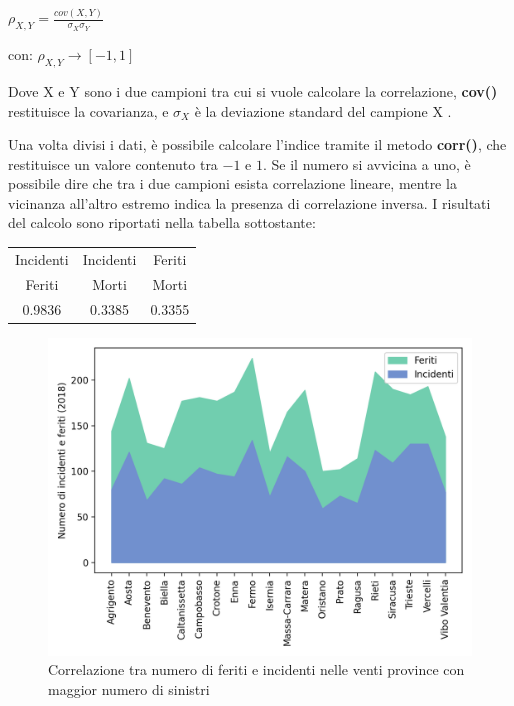 \documentclass[a4paper]{report}
\newcommand{\methodstyle}[1]{\textbf{#1}}
\begin{document}
\begin{center}
    $\rho_{X, Y} = \displaystyle \frac{cov(X, Y)}{\sigma_X \sigma_Y}$
\end{center}

\begin{center}
    con: $\rho_{X, Y} \rightarrow [-1, 1]$
\end{center}

Dove X e Y sono i due campioni tra cui si vuole calcolare la correlazione, 
\methodstyle{cov()} restituisce la covarianza, e $\sigma_X$ è la deviazione standard del 
campione X \cite{PROB_E_STATISTICA:1}. 

Una volta divisi i dati, è possibile calcolare l'indice tramite il metodo 
\methodstyle{corr()}, che restituisce un valore contenuto tra $-1$ e $1$. 
Se il numero si avvicina a uno, è possibile dire che tra i due campioni esista correlazione 
lineare, mentre la vicinanza all'altro estremo indica la presenza di correlazione inversa. 
I risultati del calcolo sono riportati nella tabella sottostante: 

\begin{center}
    \def\arraystretch{1.5}%
    \begin{tabular}{ |c|c|c| } 
    \hline
    Incidenti & Incidenti & Feriti \\ 
    Feriti & Morti & Morti \\ 
    \hline
    0.9836 & 0.3385 & 0.3355 \\ 
    \hline
    \end{tabular}
\end{center}

\begin{figure}
    \includegraphics[width=\linewidth]{../src/incidenti/incidenti_aci/provincia/corr_incidenti.png}
    \caption{Correlazione tra numero di feriti e incidenti nelle venti province con maggior numero di sinistri}
    \label{fig:corr-incidenti-feriti}
\end{figure}
\end{document}
